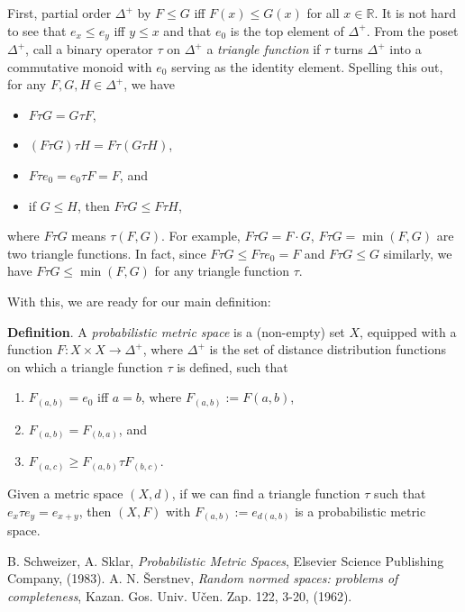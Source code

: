 \documentclass[12pt]{article}
\begin{document}
First, partial order $\Delta^+$ by $F\le G$ iff $F(x)\le G(x)$ for all $x\in \mathbb{R}$.  It is not hard to see that $e_x\le e_y$ iff $y\le x$ and that $e_0$ is the top element of $\Delta^+$.  From the poset $\Delta^+$, call a binary operator $\tau$ on $\Delta^+$ a \emph{triangle function} if $\tau$ turns $\Delta^+$ into a  commutative monoid with $e_0$ serving as the identity element.  Spelling this out, for any $F,G,H\in \Delta^+$, we have
\begin{itemize}
\item $F\tau G = G\tau F$,
\item $(F\tau G)\tau H = F \tau (G\tau H)$,
\item $F\tau e_0 = e_0 \tau F = F$, and
\item if $G\le H$, then $F\tau G\le F\tau H$,
\end{itemize}
where $F\tau G$ means $\tau(F,G)$.  For example, $F\tau G=F\cdot G$, $F\tau G=\min(F,G)$ are two triangle functions.  In fact, since $F\tau G\le F\tau e_0=F$ and $F\tau G\le G$ similarly, we have $F\tau G\le \min(F,G)$ for any triangle function $\tau$.

With this, we are ready for our main definition:

\textbf{Definition}.  A \emph{probabilistic metric space} is a (non-empty) set $X$, equipped with a function $F:X\times X\to \Delta^+$, where $\Delta^+$ is the set of distance distribution functions on which a triangle function $\tau$ is defined, such that
\begin{enumerate}
\item $F_{(a,b)}=e_0$ iff $a=b$, where $F_{(a,b)}:=F(a,b)$,
\item $F_{(a,b)}=F_{(b,a)}$, and 
\item $F_{(a,c)}\ge F_{(a,b)}\tau F_{(b,c)}$.
\end{enumerate}

Given a metric space $(X,d)$, if we can find a triangle function $\tau$ such that $e_x\tau e_y= e_{x+y}$, then $(X,F)$ with $F_{(a,b)}:=e_{d(a,b)}$ is a probabilistic metric space.

\begin{thebibliography}{9}
 B. Schweizer, A. Sklar, \emph{Probabilistic Metric Spaces}, Elsevier Science Publishing Company, (1983).
 A. N. \v{S}erstnev, \emph{Random normed spaces: problems of completeness}, Kazan. Gos. Univ. U\v{c}en. Zap. 122, 3-20, (1962).
\end{thebibliography}
\end{document}
